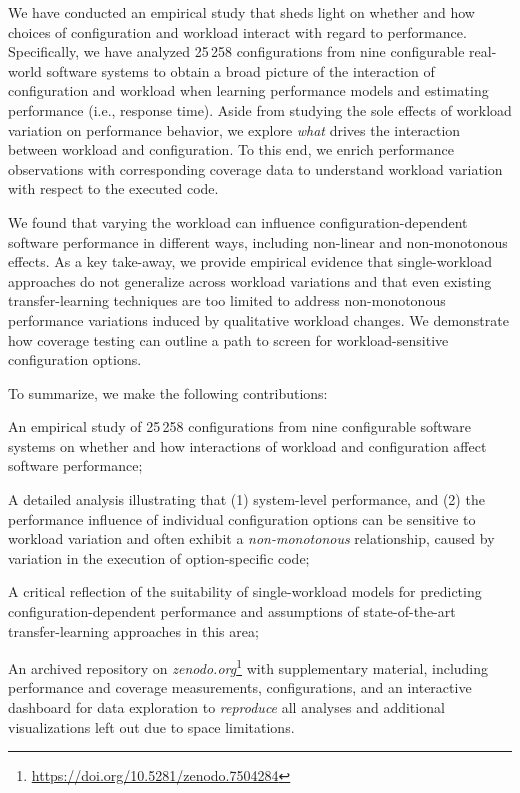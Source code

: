 We have conducted an empirical study that sheds light on whether and how choices of configuration and workload interact with regard to performance. 
Specifically, we have analyzed 25\,258 configurations from nine configurable real-world software systems to obtain a broad picture of the interaction of configuration and workload when learning performance models and estimating  performance (i.e., response time). Aside from studying the sole effects of workload variation on performance behavior, we explore \textit{what} drives the interaction between workload and configuration. To this end, we enrich performance observations with corresponding coverage data to understand workload variation with respect to the executed code.


{
	We found that varying the workload can influence configuration-dependent software performance in different ways, including non-linear and non-monotonous effects. As a key take-away, we provide empirical evidence that single-workload approaches do not generalize across workload variations  and that even existing transfer-learning techniques are too limited to address non-monotonous performance variations induced by qualitative workload changes. 
We demonstrate how coverage testing can outline a path to screen for workload-sensitive configuration options.
}

To summarize, we make the following contributions: 
\begin{compactitem}
	\item An empirical study of 25\,258 configurations from nine configurable software systems on whether and how interactions of workload and configuration affect software performance;
	{\color{black}
		\item A detailed analysis illustrating that (1) system-level performance, and (2) the performance influence of individual configuration options can be sensitive to workload variation and often exhibit a \textit{non-monotonous} relationship, caused by variation in the execution of option-specific  code;
		
		\item A critical reflection of the suitability of single-workload models for predicting configuration-dependent performance and assumptions of state-of-the-art transfer-learning approaches in this area;}
	
	\item {An archived repository on \textit{zenodo.org}\footnote{\url{https://doi.org/10.5281/zenodo.7504284}} with supplementary material, including performance and coverage measurements, configurations, and an interactive dashboard for data exploration to \textit{reproduce} all analyses and additional visualizations left out due to space limitations.}
\end{compactitem}

